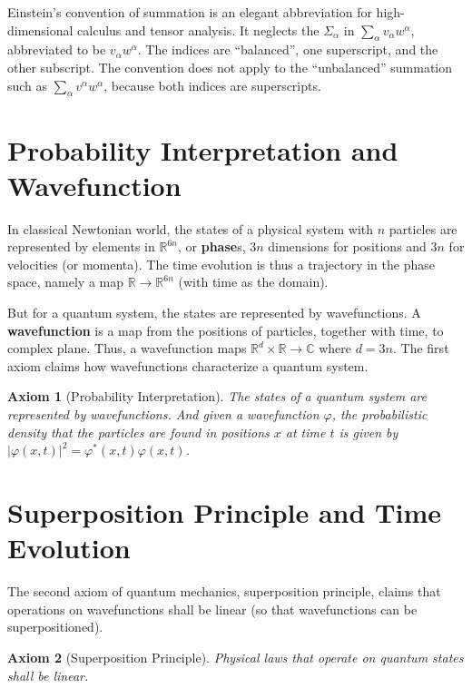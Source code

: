 \documentclass{book}
\newcommand{\tmstrong}[1]{\textbf{#1}}
\newtheorem{axiom}{Axiom}
\begin{document}
Einstein's convention of summation is an elegant abbreviation for
high-dimensional calculus and tensor analysis. It neglects the
$\Sigma_{\alpha}$ in $\sum_{\alpha} v_{\alpha} w^{\alpha}$, abbreviated to be
$v_{\alpha} w^{\alpha}$. The indices are ``balanced'', one superscript, and
the other subscript. The convention does not apply to the ``unbalanced''
summation such as $\sum_{\alpha} v^{\alpha} w^{\alpha}$, because both indices
are superscripts.

\section{Probability Interpretation and Wavefunction}

In classical Newtonian world, the states of a physical system with $n$
particles are represented by elements in $\mathbb{R}^{6 n}$, or
{\tmstrong{phase}}s, $3 n$ dimensions for positions and $3 n$ for velocities
(or momenta). The time evolution is thus a trajectory in the phase space,
namely a map $\mathbb{R} \rightarrow \mathbb{R}^{6 n}$ (with time as the
domain).

But for a quantum system, the states are represented by wavefunctions. A
{\tmstrong{wavefunction}} is a map from the positions of particles, together
with time, to complex plane. Thus, a wavefunction maps $\mathbb{R}^d \times
\mathbb{R} \rightarrow \mathbb{C}$ where $d = 3 n$. The first axiom claims how
wavefunctions characterize a quantum system.

\begin{axiom}[Probability Interpretation]
  \label{axiom:prob}The states of a quantum system are represented by
  wavefunctions. And given a wavefunction $\varphi$, the probabilistic density
  that the particles are found in positions $x$ at time $t$ is given by $|
  \varphi (x, t) |^2 = \varphi^{\ast} (x, t) \varphi (x, t)$.
\end{axiom}

\section{Superposition Principle and Time Evolution}\label{section:Superposition Principle and Time Evolution}

The second axiom of quantum mechanics, superposition principle, claims that
operations on wavefunctions shall be linear (so that wavefunctions can be
superpositioned).

\begin{axiom}[Superposition Principle]
  \label{axiom:sup}Physical laws that operate on quantum states shall be
  linear.
\end{axiom}
\end{document}
